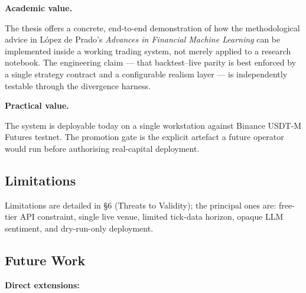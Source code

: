 \documentclass[a4paper, 12pt, titlepage]{article}
\begin{document}
\textbf{Academic value.}

The thesis offers a concrete, end-to-end demonstration of how the
methodological advice in López de Prado's \emph{Advances in
Financial Machine Learning} can be implemented inside a working
trading system, not merely applied to a research notebook. The
engineering claim --- that backtest--live parity is best enforced
by a single strategy contract and a configurable realism layer ---
is independently testable through the divergence harness.

\textbf{Practical value.}

The system is deployable today on a single workstation against
Binance USDT-M Futures testnet. The promotion gate is the explicit
artefact a future operator would run before authorising
real-capital deployment.

\subsection{Limitations}

Limitations are detailed in \S 6 (Threats to Validity); the
principal ones are: free-tier API constraint, single live venue,
limited tick-data horizon, opaque LLM sentiment, and dry-run-only
deployment.

\subsection{Future Work}

\textbf{Direct extensions:}
\end{document}
